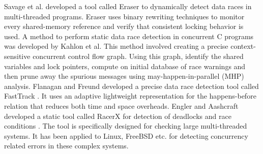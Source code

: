 Savage et al. developed a tool called Eraser \cite{savage1997eraser} to dynamically detect data races in multi-threaded programs. Eraser uses binary rewriting techniques to monitor every shared-memory reference and verify that consistent locking behavior is used. A method to perform static data race detection in concurrent C programs was developed by Kahlon et al. This method \cite{kahlon2009static} involved creating a precise context-sensitive concurrent control flow graph. Using this graph, identify the shared variables and lock pointers, compute on initial database of race warnings and then prune away the spurious messages using may-happen-in-parallel (MHP) analysis. Flanagan and Freund developed a precise data race detection tool called FastTrack \cite{flanagan2009fasttrack}. It uses an adaptive lightweight representation for the happens-before relation that reduces both time and space overheads. Engler and Aashcraft developed a static tool called RacerX for detection of deadlocks and race conditions \cite{engler2003racerx}. The tool is specifically designed for checking large multi-threaded systems. It has been applied to Linux, FreeBSD etc. for detecting concurrency related errors in these complex systems. 